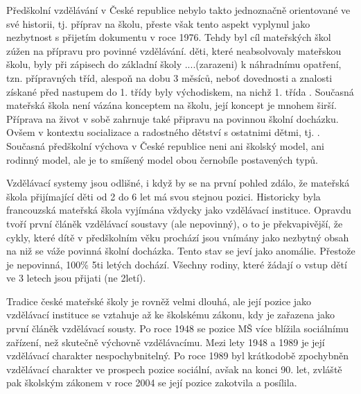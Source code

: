 Předškolní vzdělávání v České republice nebylo takto jednoznačně orientované ve své historii, tj. příprav na školu, přeste však tento aspekt vyplynul jako nezbytnost s přijetím dokumentu  v roce 1976. Tehdy byl cíl mateřských škol zúžen na přípravu pro povinné vzdělávání. děti, které neabsolvovaly mateřskou školu, byly při zápisech do základní školy ....(zarazeni) k náhradnímu opatření, tzn. přípravných tříd, alespoň na dobu 3 měsíců, neboť dovednosti a znalosti získané před nastupem do 1. třídy byly východiskem, na nichž 1. třída . Současná mateřská škola není vázána konceptem na školu, její koncept je mnohem širší. Příprava na život v sobě zahrnuje také připravu na povinnou školní docházku. Ovšem v kontextu socializace a radostného dětství s ostatnimi dětmi, tj. . Současná předškolní výchova v České republice neni ani školský model, ani rodinný model, ale je to smíšený model obou černobíle postavených typů.

Vzdělávací systemy jsou odlišné, i když by se na první pohled zdálo, že mateřská škola přijímající děti od 2 do 6 let má svou stejnou pozici. Historicky byla francouzská mateřská škola vyjímána vždycky jako vzdělávací instituce. Opravdu tvoří první článěk vzdělávací soustavy (ale nepovinný), o to je překvapivější, že cykly, které dítě v předškolním věku prochází jsou vnímány jako nezbytný obsah na niž se váže povinná školní docházka. Tento stav se jeví jako anomálie. Přestože je nepovinná, 100\% 5ti letých dochází. Všechny rodiny, které žádají o vstup dětí ve 3 letech jsou přijati (ne 2letí).

Tradice české mateřské školy je rovněž velmi dlouhá, ale její pozice jako vzdělávací instituce se vztahuje až ke školskému zákonu, kdy je zařazena jako první článěk vzdělávací sousty. Po roce 1948 se pozice MŠ více blížila sociálnímu zařízení, než skutečně výchovně vzdělávacímu. Mezi lety 1948 a 1989 je její vzdělávací charakter nespochybnitelný. Po roce 1989 byl krátkodobě zpochybněn vzdělávací charakter ve prospech pozice sociální, avšak na konci 90. let, zvláště pak školským zákonem v roce 2004 se její pozice zakotvila a posílila. 
